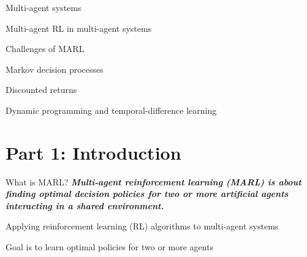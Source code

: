 

\otherslide

\subtitle{Introduction}


\maketitle

\introslide

\begin{frame}{\outline}
    \vspace{10pt}
    \vspace{5pt}
    \blist
        \item Multi-agent systems
        \item Multi-agent RL in multi-agent systems
        \item Challenges of MARL   
    \elist
    \vspace{10pt}
    \vspace{5pt}
    \blist
        \item Markov decision processes
        \item Discounted returns
        \item Dynamic programming and temporal-difference learning
    \elist
\end{frame}

\section{Part 1: Introduction}

\begin{frame}{What is MARL?}
		\textbf{\textit{Multi-agent reinforcement learning (MARL) is about finding optimal decision policies for two or more artificial agents interacting in a shared environment.}}
  \vspace{20pt}
  \blist
    \item Applying reinforcement learning (RL) algorithms to multi-agent systems
    \item Goal is to learn optimal policies for two or more agents
  \elist
\end{frame}

